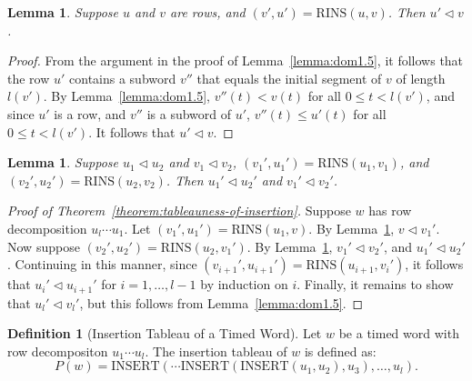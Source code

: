\documentclass[10pt]{amsproc}
\newtheorem{lemma}[theorem]{Lemma}
\theoremstyle{definition}
\newtheorem{definition}[theorem]{Definition}
\theoremstyle{remark}
\newcommand{\rowins}{\mathrm{RINS}}
\newcommand{\ins}{\mathrm{INSERT}}
\begin{document}
\begin{lemma}
  \label{lemma:dom1}
  Suppose $u$ and $v$ are rows, and $(v',u')=\rowins(u,v)$.
  Then $u'\lhd v$.
\end{lemma}
\begin{proof}
  From the argument in the proof of Lemma~\ref{lemma:dom1.5}, it follows that the row $u'$ contains a subword $v''$ that equals the initial segment of $v$ of length $l(v')$.
  By Lemma~\ref{lemma:dom1.5}, $v''(t)<v(t)$ for all $0\leq t<l(v')$, and since $u'$ is a row, and $v''$ is a subword of $u'$, $v''(t)\leq u'(t)$ for all $0\leq t<l(v')$.
  It follows that $u'\lhd v$.
\end{proof}
\begin{lemma}
  \label{lemma:dom2}
  Suppose $u_1\lhd u_2$ and $v_1\lhd v_2$, $(v_1',u_1')=\rowins(u_1,v_1)$, and $(v_2',u_2')=\rowins(u_2,v_2)$.
  Then $u_1'\lhd u_2'$ and $v_1'\lhd v_2'$.
\end{lemma}
\begin{proof}[Proof of Theorem~\ref{theorem:tableauness-of-insertion}]
  Suppose $w$ has row decomposition $u_l\dotsb u_1$.
  Let $(v_1',u_1')=\rowins(u_1,v)$.
  By Lemma~\ref{lemma:dom1}, $v\lhd v_1'$.
  Now suppose $(v_2',u_2')=\rowins(u_2,v_1')$.
  By Lemma~\ref{lemma:dom2}, $v_1'\lhd v_2'$, and $u_1'\lhd u_2'$.
  Continuing in this manner, since $(v_{i+1}',u_{i+1}')=\rowins(u_{i+1},v_i')$, it follows that $u_i'\lhd u_{i+1}'$ for $i=1,\dotsc,l-1$ by induction on $i$.
  Finally, it remains to show that $u_l'\lhd v_l'$, but this follows from Lemma~\ref{lemma:dom1.5}.
\end{proof}
\begin{definition}
  [Insertion Tableau of a Timed Word]
  Let $w$ be a timed word with row decompositon $u_1\dotsb u_l$.
  The insertion tableau of $w$ is defined as:
  \begin{displaymath}
    P(w) = \ins(\dotsb\ins(\ins(u_1, u_2),u_3),\dotsc,u_l).
  \end{displaymath}
\end{definition}
\end{document}
